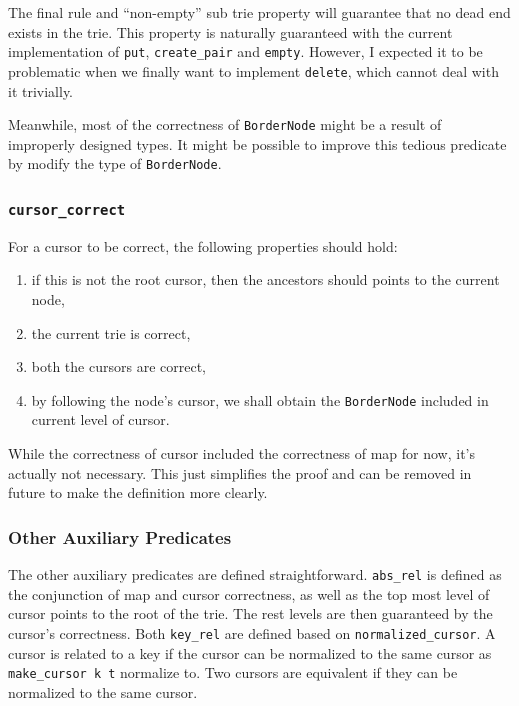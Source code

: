 \documentclass[runningheads]{llncs}
\begin{document}
The final rule and ``non-empty'' sub trie property will guarantee that no dead
end exists in the trie. This property is naturally guaranteed with the current
implementation of \texttt{put}, \texttt{create\_pair} and \texttt{empty}.
However, I expected it to be problematic when we finally want to implement
\texttt{delete}, which cannot deal with it trivially.

Meanwhile, most of the correctness of \texttt{BorderNode} might be a result of
improperly designed types. It might be possible to improve this tedious
predicate by modify the type of \texttt{BorderNode}.

\subsubsection{\texttt{cursor\_correct}}

For a cursor to be correct, the following properties should hold:

\begin{enumerate}
\item if this is not the root cursor, then the ancestors should points to the
  current node,
\item the current trie is correct,
\item both the cursors are correct,
\item by following the node's cursor, we shall obtain the \texttt{BorderNode}
  included in current level of cursor.
\end{enumerate}

While the correctness of cursor included the correctness of map for now, it's
actually not necessary. This just simplifies the proof and can be removed in
future to make the definition more clearly.

\subsubsection{Other Auxiliary Predicates}

The other auxiliary predicates are defined straightforward. \texttt{abs\_rel} is
defined as the conjunction of map and cursor correctness, as well as the top
most level of cursor points to the root of the trie. The rest levels are
then guaranteed by the cursor's correctness. Both \texttt{key\_rel} are defined
based on \texttt{normalized\_cursor}. A cursor is related to a key if the cursor
can be normalized to the same cursor as \texttt{make\_cursor k t} normalize to.
Two cursors are equivalent if they can be normalized to the same cursor.
\end{document}
